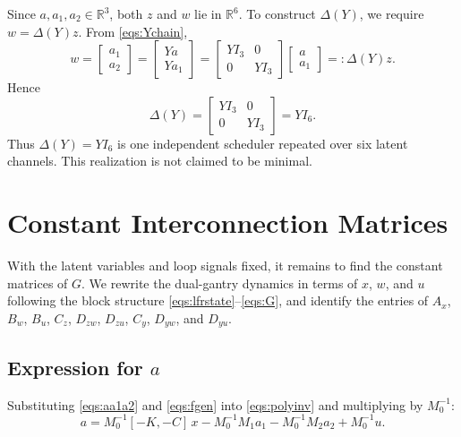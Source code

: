 \documentclass[11pt]{article}
\newcommand{\R}{\mathbb{R}}
\begin{document}
Since $a, a_1, a_2 \in \R^3$, both $z$ and $w$ lie in $\R^6$. To construct
$\Delta(Y)$, we require $w = \Delta(Y)z$. From \eqref{eqs:Ychain},
\begin{equation}
    w =
    \begin{bmatrix}
        a_1 \\
        a_2
    \end{bmatrix}
    =
    \begin{bmatrix}
        Ya \\
        Ya_1
    \end{bmatrix}
    =
    \begin{bmatrix}
        Y I_3 & 0 \\
        0 & Y I_3
    \end{bmatrix}
    \begin{bmatrix}
        a \\
        a_1
    \end{bmatrix}
    =: \Delta(Y) z.
    \label{eqs:Deltaz}
\end{equation}
Hence
\begin{equation}
    \Delta(Y) =
    \begin{bmatrix}
        Y I_3 & 0 \\
        0 & Y I_3
    \end{bmatrix}
    = Y I_6.
    \label{eqs:Delta}
\end{equation}
Thus $\Delta(Y) = YI_6$ is one independent scheduler repeated over six latent
channels. This realization is not claimed to be minimal.


\section{Constant Interconnection Matrices}
With the latent variables and loop signals fixed, it remains to find the
constant matrices of $G$. We rewrite the dual-gantry dynamics in terms of $x$,
$w$, and $u$ following the block structure
\eqref{eqs:lfrstate}--\eqref{eqs:G}, and identify the entries of $A_x$, $B_w$, $B_u$,
$C_z$, $D_{zw}$, $D_{zu}$, $C_y$, $D_{yw}$, and $D_{yu}$.

\subsection{Expression for $a$}
Substituting \eqref{eqs:aa1a2} and \eqref{eqs:fgen} into \eqref{eqs:polyinv}
and multiplying by $M_0^{-1}$:
\begin{equation}
    a = M_0^{-1}[-K,-C]\,x - M_0^{-1}M_1 a_1 - M_0^{-1}M_2 a_2 + M_0^{-1}u.
    \label{eqs:aexpanded}
\end{equation}
\end{document}
